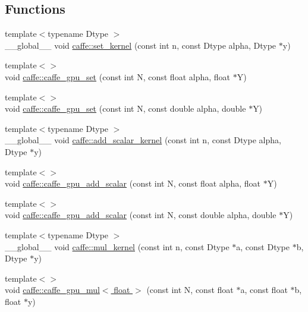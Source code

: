 \subsection*{Functions}
\begin{DoxyCompactItemize}
\item 
{\footnotesize template$<$typename Dtype $>$ }\\\+\_\+\+\_\+global\+\_\+\+\_\+ void \hyperlink{namespacecaffe_ae97b58df87eb89d1ec96c2a016e90ced}{caffe\+::set\+\_\+kernel} (const int n, const Dtype alpha, Dtype $\ast$y)
\item 
{\footnotesize template$<$$>$ }\\void \hyperlink{namespacecaffe_a298e3ff433dffce569a6150a4bbea6c6}{caffe\+::caffe\+\_\+gpu\+\_\+set} (const int N, const float alpha, float $\ast$Y)
\item 
{\footnotesize template$<$$>$ }\\void \hyperlink{namespacecaffe_a4156ed130860020848421280104678ab}{caffe\+::caffe\+\_\+gpu\+\_\+set} (const int N, const double alpha, double $\ast$Y)
\item 
{\footnotesize template$<$typename Dtype $>$ }\\\+\_\+\+\_\+global\+\_\+\+\_\+ void \hyperlink{namespacecaffe_a732b4e5823cbeb18b654845a8e0562d5}{caffe\+::add\+\_\+scalar\+\_\+kernel} (const int n, const Dtype alpha, Dtype $\ast$y)
\item 
{\footnotesize template$<$$>$ }\\void \hyperlink{namespacecaffe_ad867b51206d97a333d76d4e1390a7fa3}{caffe\+::caffe\+\_\+gpu\+\_\+add\+\_\+scalar} (const int N, const float alpha, float $\ast$Y)
\item 
{\footnotesize template$<$$>$ }\\void \hyperlink{namespacecaffe_a9d6e8b8173c0c8c4d0125082281ff529}{caffe\+::caffe\+\_\+gpu\+\_\+add\+\_\+scalar} (const int N, const double alpha, double $\ast$Y)
\item 
{\footnotesize template$<$typename Dtype $>$ }\\\+\_\+\+\_\+global\+\_\+\+\_\+ void \hyperlink{namespacecaffe_a2b2ad9026c6ca682e92ac7f06b2c1720}{caffe\+::mul\+\_\+kernel} (const int n, const Dtype $\ast$a, const Dtype $\ast$b, Dtype $\ast$y)
\item 
{\footnotesize template$<$$>$ }\\void \hyperlink{namespacecaffe_a96fc8a04e62e3f2ffdd79d5600262f0b}{caffe\+::caffe\+\_\+gpu\+\_\+mul$<$ float $>$} (const int N, const float $\ast$a, const float $\ast$b, float $\ast$y)

\end{DoxyCompactItemize}

